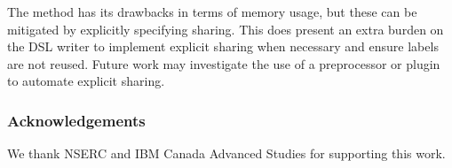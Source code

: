 \documentclass[runningheads]{llncs}
\begin{document}
The method has its drawbacks in terms of memory usage, but these can be mitigated
by explicitly specifying sharing. This does present an extra burden on the DSL
writer to implement explicit sharing when necessary and ensure labels are not
reused. Future work may investigate the use of a preprocessor or plugin to
automate explicit sharing.

\subsubsection{Acknowledgements} We thank NSERC and IBM Canada Advanced Studies for supporting this work.
%
%


\end{document}
